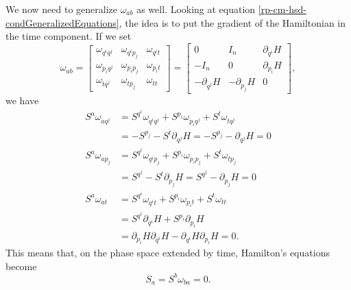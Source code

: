 We now need to generalize $\omega_{ab}$ as well. Looking at equation \ref{rp-cm-hsd-condGeneralizedEquations}, the idea is to put the gradient of the Hamiltonian in the time component. If we set
\begin{equation}\label{rp-cm-lm-contactForm}
	\tag{CF}
	\omega_{ab} = \left[\begin{array}{ccc}
		\omega_{q^i q^j} & \omega_{q^i p_j} & \omega_{q^i t} \\
		\omega_{p_i q^j} & \omega_{p_i p_j} & \omega_{p_i t} \\
		\omega_{t q^j} & \omega_{t p_j} & \omega_{t t} 
	\end{array} \right]= \left[\begin{array}{ccc}
		0 & I_n & \partial_{q^i} H \\
		- I_n & 0 & \partial_{p_i} H \\
		- \partial_{q^j} H & -\partial_{p_j} H & 0
	\end{array} \right] ,
\end{equation}
we have
\begin{equation}
	\begin{aligned}
		S^a \omega_{a q^j} &= S^{q^i}\omega_{q^i q^j} + S^{p_i}\omega_{p_i q^j} + S^{t} \omega_{t q^j} \\
		&= - S^{p_j} - S^{t} \partial_{q^j} H = - S^{p_j} -  \partial_{q^j} H = 0 \\
		S^a \omega_{a p_j} &= S^{q^i}\omega_{q^i p_j} + S^{p_i}\omega_{p_i p_j} + S^{t} \omega_{t p_j} \\
		&= S^{q^j} - S^{t} \partial_{p_j} H = S^{q^j} -  \partial_{p_j} H = 0 \\
		S^a \omega_{a t} &= S^{q^i}\omega_{q^i t} + S^{p_i}\omega_{p_i t} + S^{t} \omega_{t t} \\
		&= S^{q^i} \partial_{q^i} H + S^{p_i} \partial_{p_i} H \\
		&= \partial_{p_i} H \partial_{q^i} H - \partial_{q^i} H \partial_{p_i} H = 0.
	\end{aligned}
\end{equation}
This means that, on the phase space extended by time, Hamilton's equations become
\begin{equation}\label{rp-cm-lm-ExtPSEquation}
	\tag{HM-1E}
	S_a = S^b \omega_{ba} = 0.
\end{equation}
